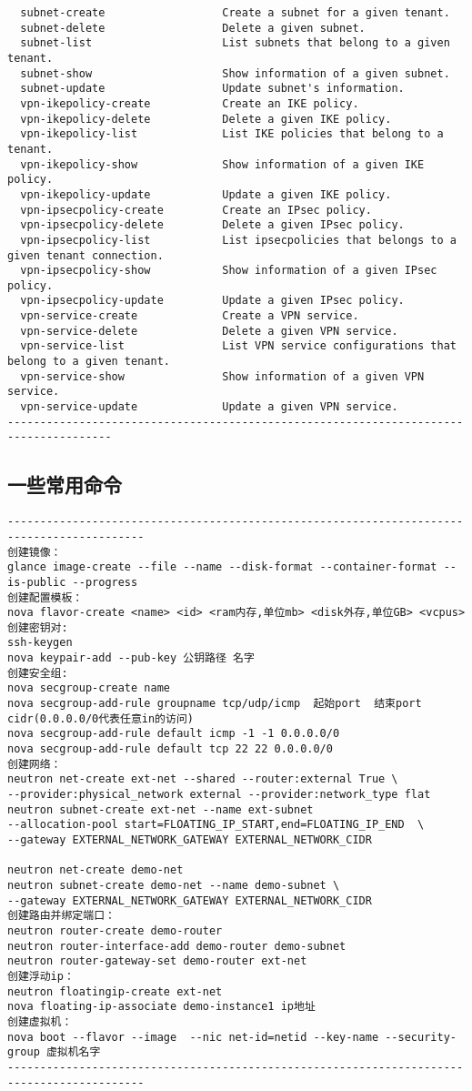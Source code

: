 \documentclass[a4paper,left=1.5cm,right=1.5cm,11pt]{article}
\begin{document}
\begin{lstlisting}
  subnet-create                  Create a subnet for a given tenant.
  subnet-delete                  Delete a given subnet.
  subnet-list                    List subnets that belong to a given tenant.
  subnet-show                    Show information of a given subnet.
  subnet-update                  Update subnet's information.
  vpn-ikepolicy-create           Create an IKE policy.
  vpn-ikepolicy-delete           Delete a given IKE policy.
  vpn-ikepolicy-list             List IKE policies that belong to a tenant.
  vpn-ikepolicy-show             Show information of a given IKE policy.
  vpn-ikepolicy-update           Update a given IKE policy.
  vpn-ipsecpolicy-create         Create an IPsec policy.
  vpn-ipsecpolicy-delete         Delete a given IPsec policy.
  vpn-ipsecpolicy-list           List ipsecpolicies that belongs to a given tenant connection.
  vpn-ipsecpolicy-show           Show information of a given IPsec policy.
  vpn-ipsecpolicy-update         Update a given IPsec policy.
  vpn-service-create             Create a VPN service.
  vpn-service-delete             Delete a given VPN service.
  vpn-service-list               List VPN service configurations that belong to a given tenant.
  vpn-service-show               Show information of a given VPN service.
  vpn-service-update             Update a given VPN service.
--------------------------------------------------------------------------------------
\end{lstlisting}

\subsection{一些常用命令}
\begin{lstlisting}
-------------------------------------------------------------------------------------------
创建镜像：
glance image-create --file --name --disk-format --container-format --is-public --progress
创建配置模板：
nova flavor-create <name> <id> <ram内存,单位mb> <disk外存,单位GB> <vcpus>
创建密钥对:
ssh-keygen
nova keypair-add --pub-key 公钥路径 名字
创建安全组:
nova secgroup-create name
nova secgroup-add-rule groupname tcp/udp/icmp  起始port  结束port  cidr(0.0.0.0/0代表任意in的访问) 
nova secgroup-add-rule default icmp -1 -1 0.0.0.0/0
nova secgroup-add-rule default tcp 22 22 0.0.0.0/0
创建网络：
neutron net-create ext-net --shared --router:external True \
--provider:physical_network external --provider:network_type flat
neutron subnet-create ext-net --name ext-subnet
--allocation-pool start=FLOATING_IP_START,end=FLOATING_IP_END  \
--gateway EXTERNAL_NETWORK_GATEWAY EXTERNAL_NETWORK_CIDR

neutron net-create demo-net
neutron subnet-create demo-net --name demo-subnet \
--gateway EXTERNAL_NETWORK_GATEWAY EXTERNAL_NETWORK_CIDR
创建路由并绑定端口：
neutron router-create demo-router
neutron router-interface-add demo-router demo-subnet
neutron router-gateway-set demo-router ext-net
创建浮动ip：
neutron floatingip-create ext-net
nova floating-ip-associate demo-instance1 ip地址
创建虚拟机：
nova boot --flavor --image  --nic net-id=netid --key-name --security-group 虚拟机名字
-------------------------------------------------------------------------------------------
\end{lstlisting}
\end{document}
